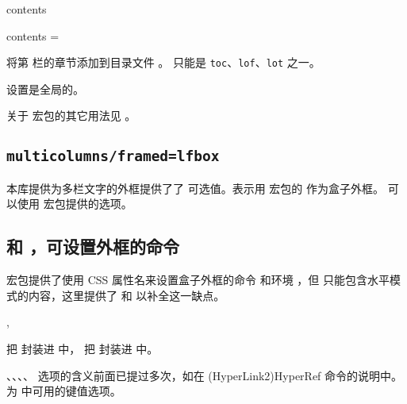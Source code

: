 \documentclass{whudoc}
\begin{document}
\begin{keyval}[path=paracol]{contents}
  \begin{syntax}
    contents =  
  \end{syntax}
  将第  栏的章节添加到目录文件 。 只能是 \texttt{toc}、\texttt{lof}、\texttt{lot} 之一。

  设置是全局的。
\end{keyval}

关于  宏包的其它用法见 。

\subsection{\texttt{multicolumns/framed=lfbox}}\label{sec:multicolumns/framed=lfbox}

本库提供为多栏文字的外框提供了了  可选值。表示用  宏包的 
 作为盒子外框。 可以使用  
宏包提供的选项。

\subsection{ 和 ，可设置外框的命令}
\label{sec:fparbox-fvarbox}

 宏包提供了使用 CSS 属性名来设置盒子外框的命令  和环境 ，但  只能包含水平模式的内容，这里提供了  和  以补全这一缺点。

\begin{function}{\fparbox,\fvarbox}
  \begin{syntax}
    \V\fparbox {} 
    \V\fparbox {}     
    \V\fvarbox {} 
    \V\fvarbox {}     
  \end{syntax}

 把  封装进  中， 把  封装进  中。

、、、、 选项的含义前面已提过多次，如在 \csref(HyperLink2){HyperRef} 命令的说明中。 为  中可用的键值选项。
\end{function}
\end{document}
